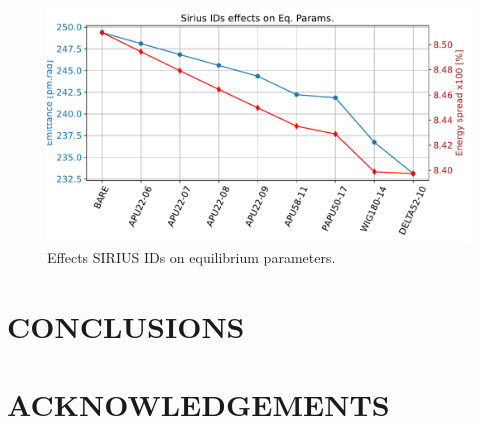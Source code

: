 \documentclass[a4paper,
               keeplastbox,   %
               ]{jacow}
\begin{document}
\begin{figure}[!h]
    \centering
   \includegraphics[width=\columnwidth]{eqparams.pdf}
   \caption{Effects SIRIUS IDs on equilibrium parameters.}
   \label{fig:eq_param}
\end{figure}

\section{CONCLUSIONS}


\section{ACKNOWLEDGEMENTS}
\end{document}
